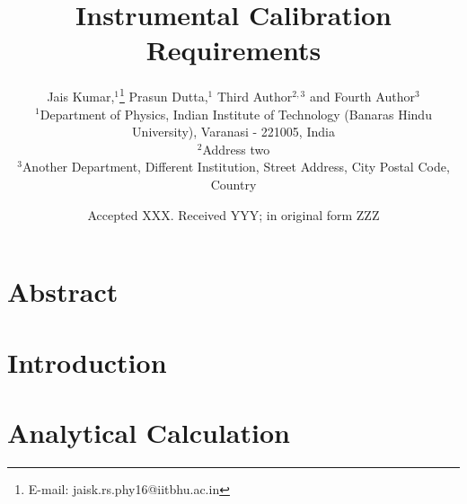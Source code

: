 \documentclass[fleqn,usenatbib]{mnras}
\title{Instrumental Calibration Requirements}
\author[Kumar et al.]{Jais Kumar,$^{1}$\thanks{E-mail: jaisk.rs.phy16@iitbhu.ac.in}
Prasun Dutta,$^{1}$
Third Author$^{2,3}$
and Fourth Author$^{3}$
\\
$^{1}$Department of Physics, Indian Institute of Technology (Banaras Hindu University), Varanasi - 221005, India\\
$^{2}$Address two\\
$^{3}$Another Department, Different Institution, Street Address, City Postal Code, Country
}
\date{Accepted XXX. Received YYY; in original form ZZZ}
\begin{document}
\label{firstpage}
\pagerange{\pageref{firstpage}--\pageref{lastpage}}
\maketitle

\section{Abstract}

\section{Introduction}

\section{Analytical Calculation}
\end{document}
